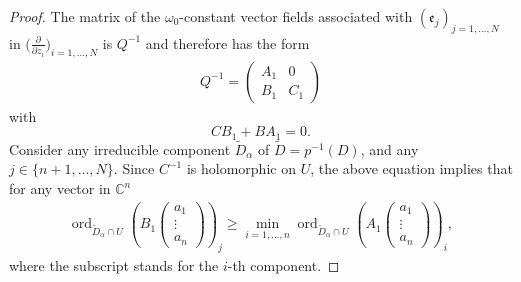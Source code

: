 \documentclass[pdftex]{sigma}
\newcommand{\der}[2]{\frac{\partial #1}{\partial#2}}
\numberwithin{equation}{section}
\begin{document}
\begin{proof}
The matrix of the $\omega_0$-constant vector fields associated with $(\mathfrak{e}_j)_{j=1,\dots,N}$ in $\big(\der{}{z_i}\big)_{i=1,\dots,N}$ is $Q^{-1}$ and therefore has the form
\begin{align*}%
Q^{-1}= \begin{pmatrix} A_1 & 0 \\ B_1 & C_1\end{pmatrix} \end{align*}
 with
\[
CB_1+BA_1 =0.
\]
Consider any irreducible component $\tilde{D}_\alpha$ of $\tilde{D}=p^{-1}(D)$, and any $j\in \{n+1,\dots,N\}$. Since $C^{-1}$ is holomorphic on $U$, the above equation implies that for any vector in $\mathbb{C}^n$
\begin{align}\label{ordres}
 \operatorname{ord}_{\tilde{D}_\alpha \cap U}  \left(B_1 \begin{pmatrix} a_1\\ \vdots \\ a_n \end{pmatrix}\right)_j \geq \min_{i=1,\dots,n}
\operatorname{ord}_{\tilde{D}_\alpha \cap U}  \left( A_1\begin{pmatrix}a_1\\\vdots \\ a_n \end{pmatrix}\right)_i, \end{align}
 where the subscript stands for the $i$-th component.


\end{proof}
\end{document}
